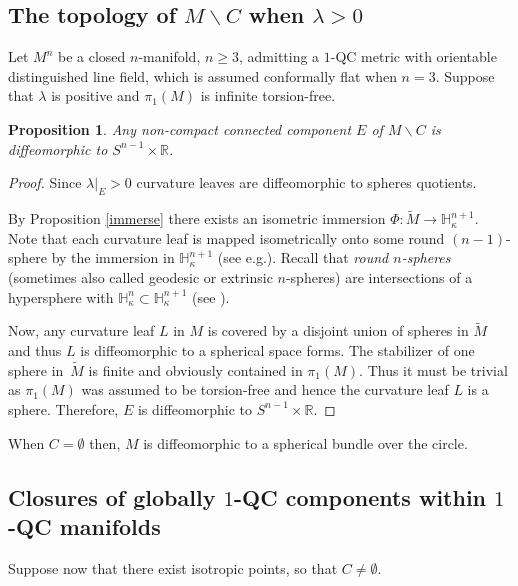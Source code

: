 \documentclass[10pt]{amsart}
\let\moins\smallsetminus
\newtheorem{proposition}[theorem]{Proposition}
\theoremstyle{definition}
\theoremstyle{remark}
\numberwithin{equation}{section}
\newcommand{\RR}{\mathbb R}
\providecommand{\eg}{e.g.}\providecommand{\ie}{i.e.}\providecommand{\etc}{etc.}\providecommand{\resp}{resp.}\providecommand{\cf}{cf.}
\begin{document}
\subsection{The topology of $M\moins C$ when $\lambda >0$}
Let $M^n$ be a closed $n$-manifold, $n\geq3$, admitting a $1$-QC metric with orientable distinguished line field, which is
assumed conformally flat when $n=3$.
Suppose that $\lambda$ is positive and $\pi_1(M)$ is infinite torsion-free.

\begin{proposition}\label{leaves}
Any non-compact connected component $E$ of $M\moins C$
is diffeomorphic to $S^{n-1}\times \RR$.
\end{proposition}
\begin{proof}
Since $\lambda|_E >0$ curvature leaves are
diffeomorphic to spheres quotients.

By Proposition \ref{immerse} there exists an isometric immersion
$\Phi: \widetilde{M}\to \mathbb H_{\kappa}^{n+1}$. Note that
each curvature leaf is mapped isometrically onto some round
$(n-1)$-sphere by the immersion in $\mathbb H_{\kappa}^{n+1}$
(see \eg \cite{Re2}). Recall that \emph{round $n$-spheres}
(sometimes also called geodesic or extrinsic $n$-spheres) are
intersections of a hypersphere with $\mathbb H_{\kappa}^{n}\subset \mathbb H_{\kappa}^{n+1}$ (see
\cite[\S2]{Re2}).

Now, any curvature leaf $L$ in $M$ is covered by
a disjoint union of spheres in $\widetilde{M}$ and thus $L$ is
diffeomorphic to a spherical space forms.
The stabilizer of one sphere in~$\widetilde{M}$
is finite and obviously contained in $\pi_1(M)$.
Thus it must be trivial as $\pi_1(M)$ was assumed to be torsion-free
and hence the curvature leaf $L$ is a sphere. Therefore, $E$ is diffeomorphic to $S^{n-1}\times \RR$.
\end{proof}
When $C=\emptyset$ then, $M$ is
diffeomorphic to a spherical bundle over the circle.

\subsection{Closures of globally $1$-QC components within $1$-QC manifolds}
Suppose now that there exist isotropic points, so
that $C\neq\emptyset$.
\end{document}
